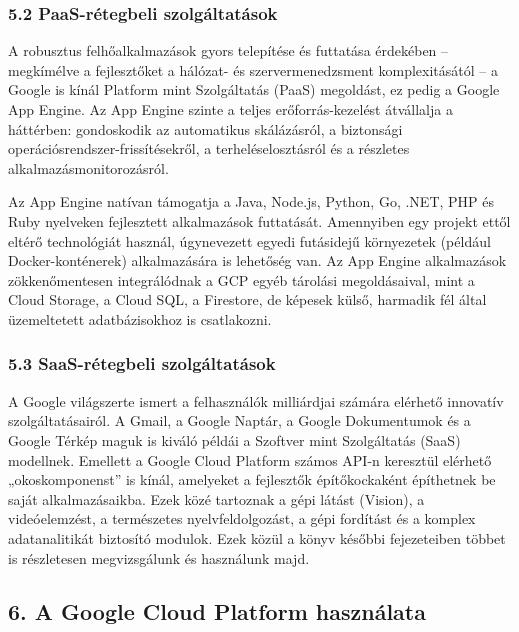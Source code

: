 \documentclass[
]{article}
\begin{document}
\hypertarget{paas-ruxe9tegbeli-szolguxe1ltatuxe1sok-1}{%
\subsubsection{5.2 PaaS-rétegbeli
szolgáltatások}\label{paas-ruxe9tegbeli-szolguxe1ltatuxe1sok-1}}

A robusztus felhőalkalmazások gyors telepítése és futtatása érdekében --
megkímélve a fejlesztőket a hálózat- és szervermenedzsment
komplexitásától -- a Google is kínál Platform mint Szolgáltatás (PaaS)
megoldást, ez pedig a Google App Engine. Az App Engine szinte a teljes
erőforrás-kezelést átvállalja a háttérben: gondoskodik az automatikus
skálázásról, a biztonsági operációsrendszer-frissítésekről, a
terheléselosztásról és a részletes alkalmazásmonitorozásról.

Az App Engine natívan támogatja a Java, Node.js, Python, Go, .NET, PHP
és Ruby nyelveken fejlesztett alkalmazások futtatását. Amennyiben egy
projekt ettől eltérő technológiát használ, úgynevezett egyedi futásidejű
környezetek (például Docker-konténerek) alkalmazására is lehetőség van.
Az App Engine alkalmazások zökkenőmentesen integrálódnak a GCP egyéb
tárolási megoldásaival, mint a Cloud Storage, a Cloud SQL, a Firestore,
de képesek külső, harmadik fél által üzemeltetett adatbázisokhoz is
csatlakozni.

\hypertarget{saas-ruxe9tegbeli-szolguxe1ltatuxe1sok-1}{%
\subsubsection{5.3 SaaS-rétegbeli
szolgáltatások}\label{saas-ruxe9tegbeli-szolguxe1ltatuxe1sok-1}}

A Google világszerte ismert a felhasználók milliárdjai számára elérhető
innovatív szolgáltatásairól. A Gmail, a Google Naptár, a Google
Dokumentumok és a Google Térkép maguk is kiváló példái a Szoftver mint
Szolgáltatás (SaaS) modellnek. Emellett a Google Cloud Platform számos
API-n keresztül elérhető „okoskomponenst'' is kínál, amelyeket a
fejlesztők építőkockaként építhetnek be saját alkalmazásaikba. Ezek közé
tartoznak a gépi látást (Vision), a videóelemzést, a természetes
nyelvfeldolgozást, a gépi fordítást és a komplex adatanalitikát
biztosító modulok. Ezek közül a könyv későbbi fejezeteiben többet is
részletesen megvizsgálunk és használunk majd.

\hypertarget{a-google-cloud-platform-hasznuxe1lata}{%
\subsection{6. A Google Cloud Platform
használata}\label{a-google-cloud-platform-hasznuxe1lata}}
\end{document}
